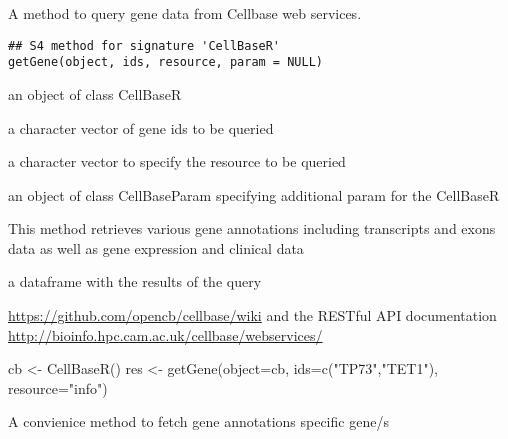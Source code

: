 \documentclass[letterpaper]{book}
\begin{document}
%
\begin{Description}\relax
A method to query gene data from Cellbase web services.
\end{Description}
%
\begin{Usage}
\begin{verbatim}
## S4 method for signature 'CellBaseR'
getGene(object, ids, resource, param = NULL)
\end{verbatim}
\end{Usage}
%
\begin{Arguments}
\begin{ldescription}
\item[\code{object}] an object of class CellBaseR

\item[\code{ids}] a character vector of gene ids to be queried

\item[\code{resource}] a character vector to specify the resource to be queried

\item[\code{param}] an object of class CellBaseParam specifying additional param
for the CellBaseR
\end{ldescription}
\end{Arguments}
%
\begin{Details}\relax
This method retrieves various gene annotations including transcripts
and exons data as well as gene expression and clinical data
\end{Details}
%
\begin{Value}
a dataframe with the results of the query
\end{Value}
%
\begin{SeeAlso}\relax
\url{https://github.com/opencb/cellbase/wiki} 
and the RESTful API documentation 
\url{http://bioinfo.hpc.cam.ac.uk/cellbase/webservices/}
\end{SeeAlso}
%
\begin{Examples}
\begin{ExampleCode}
   cb <- CellBaseR()
   res <- getGene(object=cb, ids=c("TP73","TET1"), resource="info")
\end{ExampleCode}
\end{Examples}
%
\begin{Description}\relax
A convienice method to fetch gene annotations specific gene/s
\end{Description}
\end{document}
